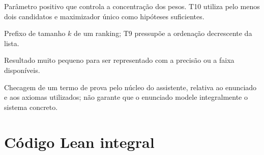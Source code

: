 \documentclass[12pt,openany,oneside,a4paper,brazil,chapter=TITLE]{abntex2}
\begin{document}
\begin{description}[style=nextline,leftmargin=0pt,labelindent=0pt]
\item[Temperatura.] Parâmetro positivo que controla a concentração dos pesos. T10 utiliza pelo menos dois candidatos e maximizador único como hipóteses suficientes.
\item[Top-\textit{k}.] Prefixo de tamanho $k$ de um ranking; T9 pressupõe a ordenação decrescente da lista.
\item[Underflow.] Resultado muito pequeno para ser representado com a precisão ou a faixa disponíveis.
\item[Verificação por máquina.] Checagem de um termo de prova pelo núcleo do assistente, relativa ao enunciado e aos axiomas utilizados; não garante que o enunciado modele integralmente o sistema concreto.
\end{description}



\apendices
\chapter{Código Lean integral}
\label{ap:lean}
\end{document}
